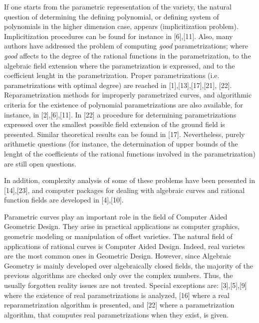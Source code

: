 If one starts from the parametric representation of the variety, the 
natural question of determining the  defining polynomial, or defining 
system of polynomials in the higher dimension case, appears 
(implicitization problem).  Implicitization procedures can be found for 
instance in [6],[11]. Also, many authors have addressed the problem of 
computing {\it good} parametrizations; where {\it good} affects to the 
degree of the rational functions in the parametrization, to the algebraic 
field extension where the parametrization is expressed, and to the  
coefficient lenght in the parametrization.  Proper parametrizations (i.e. 
parametrizations with optimal degree) are reached in [1],[13],[17],[21],
[22]. Reparametrization methods for improperly parametrized curves, and 
 algorithmic criteria for the existence of polynomial parametrizations are  
also available, for instance, in [2],[6],[11]. In [22] a procedure for 
determining parametrizations expressed over the smallest possible field 
extension of the ground field is presented. Similar theoretical results 
can be found in [17]. Nevertheless, purely arithmetic questions (for 
instance, the determination of upper bounds of the lenght of the 
coefficients of the rational functions involved in the parametrization) 
are still open questions. 

In addition, complexity analysis of some of these problems have been 
presented in [14],[23], and computer packages for dealing with algebraic 
curves and rational function fields are developed in [4],[10].

Parametric curves play an important role in the field of Computer Aided 
Geometric Design. They arise in practical applications as computer 
graphics, geometric modeling or manipulation of offset varieties. The 
natural field of applications of rational curves is Computer Aided 
Design.  Indeed, real varietes are the most common ones in Geometric 
Design. However, since Algebraic Geometry is mainly developed over 
algebraically closed fields, the majority of the previous 
algorithms are checked only over  the complex numbers. Thus, the usually 
forgotten reality issues are not treated. Special exceptions are: 
[3],[5],[9] where the existence of real parametrizations is analyzed, 
[16] where a real reparametrization algorithm is presented, 
and [22] where a  parametrization algorithm, that computes real 
parametrizations when they exist, is given. 

